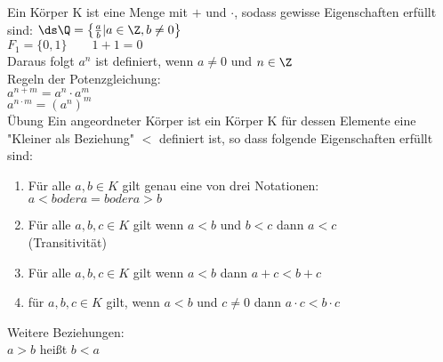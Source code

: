 %
\wdh
Ein Körper K ist eine Menge mit $+$ und $\cdot$, sodass gewisse Eigenschaften erfüllt sind:
\bsp
$\ds\Q = \left\{\frac{a}{b} | a \in \Z, b \neq 0\right\}$\\
$F_1 = \{0, 1\} \qquad 1 + 1 = 0$\\
Daraus folgt $a^n$ ist definiert, wenn $a \neq 0$ und $n \in \Z$\\
Regeln der Potenzgleichung:\\
$a^{n+m} = a^n \cdot a^m$\\
$a^{n \cdot m} = (a^{n})^m$\\
\bew
Übung
%
    Ein angeordneter Körper ist ein Körper K für dessen Elemente eine "Kleiner als Beziehung" $<$ definiert ist, so dass folgende Eigenschaften erfüllt sind:\\
    \begin{enumerate}
    \item{Für alle $a, b \in K$ gilt genau eine von drei Notationen:\\
    $a < b oder a = b oder a > b$}
    \item{Für alle $a, b, c \in K$ gilt wenn $a < b$ und $b < c$ dann $a < c$\\ (Transitivität)}
    \item{Für alle $a, b, c \in K$ gilt wenn $a < b$ dann $a + c < b + c$}
    \item{für $a, b, c \in K$ gilt, wenn $a < b$ und $c \neq 0$ dann $a \cdot c < b \cdot c$}
    \end{enumerate}
	Weitere Beziehungen:\\
	$a > b$ heißt $b < a$\\
